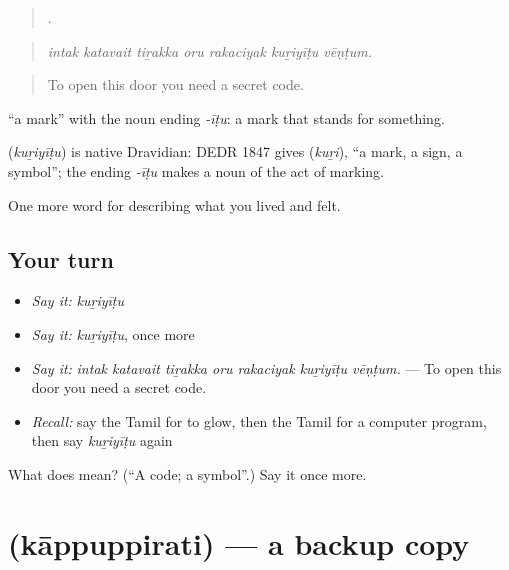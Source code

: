 \begin{quote}
      .
\end{quote}

\begin{quote}
\emph{intak katavait tiṟakka oru rakaciyak kuṟiyīṭu vēṇṭum.}
\end{quote}

\begin{quote}
To open this door you need a secret code.
\end{quote}

 \textquotedblleft{}a mark\textquotedblright{} with the noun ending \emph{-īṭu}: a mark that stands for something.

\begin{cousinweb}
\textbf{} (\emph{kuṟiyīṭu}) is native Dravidian: DEDR 1847 gives  (\emph{kuṟi}), \textquotedblleft{}a mark, a sign, a symbol\textquotedblright{}; the ending \emph{-īṭu} makes a noun of the act of marking.
\end{cousinweb}

\begin{grammarlens}[title={What you've built}]
One more word for describing what you lived and felt.
\end{grammarlens}

\subsection*{Your turn}
\begin{itemize}
\raggedright
  \item \emph{Say it:} \emph{kuṟiyīṭu}
  \item \emph{Say it:} \emph{kuṟiyīṭu}, once more
  \item \emph{Say it:} \emph{intak katavait tiṟakka oru rakaciyak kuṟiyīṭu vēṇṭum.} — To open this door you need a secret code.
  \item \emph{Recall:} say the Tamil for to glow, then the Tamil for a computer program, then say \emph{kuṟiyīṭu} again
\end{itemize}

\begin{tcolorbox}[breakable,colback=teal!4,colframe=teal!35!black,title={Before you move on}]
What does  mean? (\textquotedblleft{}A code; a symbol\textquotedblright{}.) Say it once more.
\end{tcolorbox}
\section[\texorpdfstring{\ta{காப்புப்பிரதி} (kāppuppirati)}{காப்புப்பிரதி (kāppuppirati)}]{ (kāppuppirati) — a backup copy}

